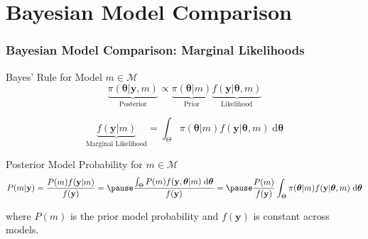 \section{Bayesian Model Comparison}
\begin{frame}
  \frametitle{Bayesian Model Comparison: Marginal Likelihoods}



  \begin{block}{Bayes' Rule for Model $m\in\mathcal{M}$}
    \footnotesize
    \vspace{-1em}
  \[
    \underbrace{\pi(\boldsymbol{\theta}|\mathbf{y},m)}_{\text{Posterior}} \propto \underbrace{\pi(\boldsymbol{\theta}|m)}_{\text{Prior}}\underbrace{ f(\mathbf{y}|\boldsymbol{\theta},m)}_{\text{Likelihood}}
  \]

  \[
   \underbrace{f(\mathbf{y}|m)}_{\text{Marginal Likelihood}} = \int_\Theta \pi(\boldsymbol{\theta}|m)f(\mathbf{y}|\boldsymbol{\theta},m)\; \text{d}\boldsymbol{\theta}
  \]
  \end{block}

  \pause

  \begin{block}{Posterior Model Probability for $m \in \mathcal{M}$}
    \footnotesize
    \vspace{-1em}
   \[
     P(m|\mathbf{y}) = \frac{P(m)f(\mathbf{y}|m)}{f(\mathbf{y})} = \pause \frac{\int_\Theta P(m) f(\mathbf{y},\boldsymbol{\theta}|m)\;  \text{d}\boldsymbol{\theta}}{f(\mathbf{y})} = \pause \frac{P(m)}{f(\mathbf{y})} \int_\Theta \pi(\boldsymbol{\theta}|m)f(\mathbf{y}|\boldsymbol{\theta},m)\; \text{d}\boldsymbol{\theta} 
   \]

   where $P(m)$ is the \alert{prior model probability} and $f(\mathbf{y})$ is constant across models.
  \end{block}

\end{frame}
